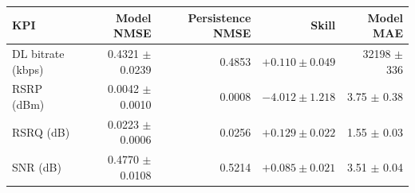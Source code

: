 \begin{tabular}{lrrrr}
\toprule
KPI & Model NMSE & Persistence NMSE & Skill & Model MAE \\
\midrule
DL bitrate (kbps) & 0.4321 $\pm$ 0.0239 & 0.4853 & $+0.110\pm0.049$ & 32198 $\pm$ 336 \\
RSRP (dBm) & 0.0042 $\pm$ 0.0010 & 0.0008 & $-4.012\pm1.218$ & 3.75 $\pm$ 0.38 \\
RSRQ (dB) & 0.0223 $\pm$ 0.0006 & 0.0256 & $+0.129\pm0.022$ & 1.55 $\pm$ 0.03 \\
SNR (dB) & 0.4770 $\pm$ 0.0108 & 0.5214 & $+0.085\pm0.021$ & 3.51 $\pm$ 0.04 \\
\bottomrule
\end{tabular}

